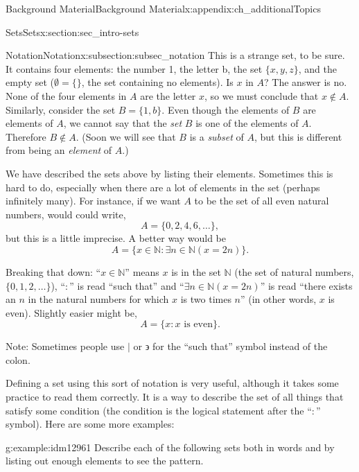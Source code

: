 \documentclass[oneside,10pt,]{book}
\numberwithin{equation}{chapter}
\def\N{\mathbb N}
\def\st{:}
\begin{document}
\begin{appendixptx}{Background Material}{}{Background Material}{}{}{x:appendix:ch_additionalTopics}
\begin{sectionptx}{Sets}{}{Sets}{}{}{x:section:sec_intro-sets}
\begin{subsectionptx}{Notation}{}{Notation}{}{}{x:subsection:subsec_notation}
This is a strange set, to be sure. It contains four elements: the number 1, the letter b, the set \(\{x,y,z\}\), and the empty set (\(\emptyset = \{ \}\), the set containing no elements). Is \(x\) in \(A\)? The answer is no. None of the four elements in \(A\) are the letter \(x\), so we must conclude that \(x \notin A\). Similarly, consider the set \(B = \{1,b\}\). Even though the elements of \(B\) are elements of \(A\), we cannot say that the \emph{set} \(B\) is one of the elements of \(A\). Therefore \(B \notin A\). (Soon we will see that \(B\) is a \emph{subset} of \(A\), but this is different from being an \emph{element} of \(A\).)%
\par
We have described the sets above by listing their elements. Sometimes this is hard to do, especially when there are a lot of elements in the set (perhaps infinitely many). For instance, if we want \(A\) to be the set of all even natural numbers, would could write,%
\begin{equation*}
A = \{0, 2, 4, 6, \ldots\},
\end{equation*}
but this is a little imprecise. A better way would be%
\begin{equation*}
A = \{x \in \N \st \exists n\in \N ( x = 2 n)\}.
\end{equation*}
%
\par
Breaking that down: ``\(x \in \N\)'' means \(x\) is in the set \(\N\) (the set of natural numbers, \(\{0,1,2,\ldots\}\)), ``\(:\)'' is read ``such that'' and ``\(\exists n\in \N (x = 2n) \)'' is read ``there exists an \(n\) in the natural numbers for which \(x\) is two times \(n\)'' (in other words, \(x\) is even). Slightly easier might be,%
\begin{equation*}
A = \{x \st x\text{ is even} \}.
\end{equation*}
%
\par
Note: Sometimes people use \(|\) or \(\backepsilon\) for the ``such that'' symbol instead of the colon.%
\par
Defining a set using this sort of notation is very useful, although it takes some practice to read them correctly. It is a way to describe the set of all things that satisfy some condition (the condition is the logical statement after the ``\(\st\)'' symbol). Here are some more examples:%
\begin{example}{}{g:example:idm12961}%
Describe each of the following sets both in words and by listing out enough elements to see the pattern.%
\par
%
\begin{enumerate}

\end{enumerate}
\end{example}
\end{subsectionptx}
\end{sectionptx}
\end{appendixptx}
\end{document}

